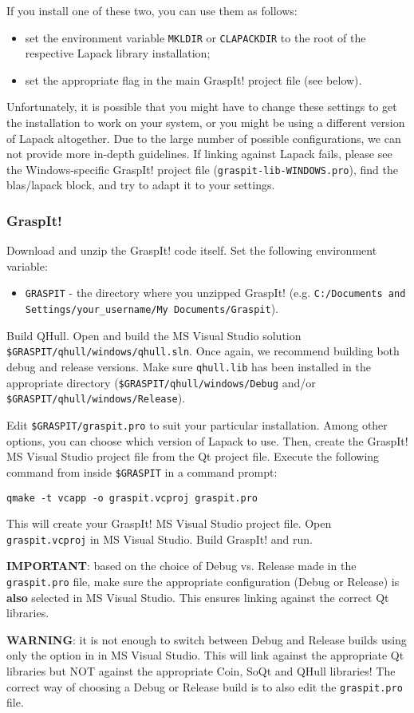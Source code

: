 If you install one of these two, you can use them as follows:
\begin{itemize}
\item set the environment variable \texttt{MKLDIR} or
  \texttt{CLAPACKDIR} to the root of the respective Lapack library
  installation;
\item set the appropriate flag in the main GraspIt! project file (see below).
\end{itemize}

Unfortunately, it is possible that you might have to change these
settings to get the installation to work on your system, or you might
be using a different version of Lapack altogether. Due to the large
number of possible configurations, we can not provide more in-depth
guidelines. If linking against Lapack fails, please see the
Windows-specific GraspIt! project file
(\texttt{graspit-lib-WINDOWS.pro}), find the blas/lapack block, and
try to adapt it to your settings.

\subsubsection{GraspIt!}

Download and unzip the GraspIt! code itself. Set the following
environment variable:

\begin{itemize}
\item \texttt{GRASPIT} - the directory where you unzipped GraspIt! (e.g. \texttt{C:/Documents and Settings/your\_username/My Documents/Graspit}).
\end{itemize}

Build QHull. Open and build the MS Visual Studio solution
\texttt{\$GRASPIT/qhull/windows/qhull.sln}. Once again, we recommend building
both debug and release versions. Make sure \texttt{qhull.lib} has been
installed in the appropriate directory
(\texttt{\$GRASPIT/qhull/windows/Debug}
and/or \texttt{\$GRASPIT/qhull/windows/Release}).

Edit \texttt{\$GRASPIT/graspit.pro} to suit your particular
installation. Among other options, you can choose which version of
Lapack to use. Then, create the GraspIt! MS Visual Studio project file
from the Qt project file. Execute the following command from inside
\texttt{\$GRASPIT} in a command prompt:

\texttt{qmake -t vcapp -o graspit.vcproj graspit.pro}

This will create your GraspIt! MS Visual Studio project file. Open
\texttt{graspit.vcproj} in MS Visual Studio. Build GraspIt! and run.

\textbf{IMPORTANT}: 
based on the choice of Debug vs. Release made in
the \texttt{graspit.pro} file, make sure the appropriate configuration
(Debug or Release) is \textbf{also} selected in MS Visual Studio. This
ensures linking against the correct Qt libraries.

\textbf{WARNING}: it is not enough to switch between Debug and Release builds
using only the option in in MS Visual Studio. This will link against
the appropriate Qt libraries but NOT against the appropriate Coin,
SoQt and QHull libraries! The correct way of choosing a Debug or
Release build is to also edit the \texttt{graspit.pro} file.
